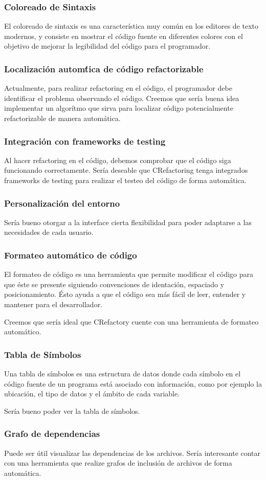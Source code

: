 \documentclass[a4paper,oneside,12pt]{article}
\begin{document}
\subsubsection{Coloreado de Sintaxis}
El coloreado de sintaxis es una caracter\'istica muy com\'un en los editores de texto modernos, y consiste en mostrar el c\'odigo fuente en diferentes colores con el objetivo de mejorar la legibilidad del c\'odigo para el programador.

\subsubsection{Localizaci\'on autom\'tica de c\'odigo refactorizable}
Actualmente, para realizar refactoring en el c\'odigo, el programador debe identificar el problema observando el c\'odigo. Creemos que ser\'ia buena idea implementar un algor\'itmo que sirva para localizar c\'odigo potencialmente refactorizable de manera autom\'atica.

\subsubsection{Integraci\'on con frameworks de testing}
Al hacer refactoring en el c\'odigo, debemos comprobar que el c\'odigo siga funcionando correctamente. Ser\'ia deseable que CRefactoring tenga integrados frameworks de testing para realizar el testeo del c\'odigo de forma autom\'atica.

\subsubsection{Personalizaci\'on del entorno}
Ser\'ia bueno otorgar a la interface cierta flexibilidad para poder adaptarse a las necesidades de cada usuario.


\subsubsection{Formateo autom\'atico de c\'odigo}
El formateo de c\'odigo es una herramienta que permite modificar el c\'odigo para que \'este se presente siguiendo convenciones de identaci\'on, espaciado y posicionamiento. \'Esto ayuda a que el c\'odigo sea m\'as f\'acil de leer, entender y mantener para el desarrollador.

Creemos que ser\'ia ideal que CRefactory cuente con una herramienta de formateo autom\'atico.


\subsubsection{Tabla de S\'imbolos}
Una tabla de s\'imbolos es una estructura de datos donde cada s\'imbolo en el c\'odigo fuente de un programa est\'a asociado con informaci\'on, como por ejemplo la ubicaci\'on, el tipo de datos y el \'ambito de cada variable.

Ser\'ia bueno poder ver la tabla de s\'imbolos.

\subsubsection{Grafo de dependencias}
Puede ser \'util visualizar las dependencias de los archivos. Ser\'ia interesante contar con una herramienta que realize grafos de inclusi\'on de archivos de forma autom\'atica.
\end{document}
